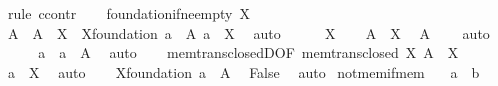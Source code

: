 \begin{isabellebody}
%
\isatagproof
{}\isamarkupfalse%
\ {\isacharparenleft}{\kern0pt}rule\ ccontr{\isacharparenright}{\kern0pt}\isanewline
\ \ \isamarkupfalse%
\ foundation{\isacharunderscore}{\kern0pt}if{\isacharunderscore}{\kern0pt}ne{\isacharunderscore}{\kern0pt}empty\ {\isacartoucheopen}X\ {\isasymnoteq}\ {\isacharbraceleft}{\kern0pt}{\isacharbraceright}{\kern0pt}{\isacartoucheclose}\isanewline
\ \ \ \ \isamarkupfalse%
\ A\ \ {\isachardoublequoteopen}A\ {\isasymin}\ X{\isachardoublequoteclose}\ \ X{\isacharunderscore}{\kern0pt}foundation{\isacharcolon}{\kern0pt}\ {\isachardoublequoteopen}{\isasymforall}a\ {\isasymin}\ A{\isachardot}{\kern0pt}\ a\ {\isasymnotin}\ X{\isachardoublequoteclose}\ \isamarkupfalse%
\ auto\isanewline
\ \ \isamarkupfalse%
\ {\isachardoublequoteopen}{\isacharbraceleft}{\kern0pt}{\isacharbraceright}{\kern0pt}\ {\isasymnotin}\ X{\isachardoublequoteclose}\isanewline
\ \ \isamarkupfalse%
\ {\isacartoucheopen}A\ {\isasymin}\ X{\isacartoucheclose}\ \isamarkupfalse%
\ {\isachardoublequoteopen}A\ {\isasymnoteq}\ {\isacharbraceleft}{\kern0pt}{\isacharbraceright}{\kern0pt}{\isachardoublequoteclose}\ \isamarkupfalse%
\ auto\isanewline
\ \ \isamarkupfalse%
\ \isamarkupfalse%
\ a\ \ {\isachardoublequoteopen}a\ {\isasymin}\ A{\isachardoublequoteclose}\ \isamarkupfalse%
\ auto\isanewline
\ \ \isamarkupfalse%
\ mem{\isacharunderscore}{\kern0pt}trans{\isacharunderscore}{\kern0pt}closedD{\isacharbrackleft}{\kern0pt}OF\ {\isacartoucheopen}mem{\isacharunderscore}{\kern0pt}trans{\isacharunderscore}{\kern0pt}closed\ X{\isacartoucheclose}\ {\isacartoucheopen}A\ {\isasymin}\ X{\isacartoucheclose}{\isacharbrackright}{\kern0pt}\ \isamarkupfalse%
\ {\isachardoublequoteopen}a\ {\isasymin}\ X{\isachardoublequoteclose}\ \isamarkupfalse%
\ auto\isanewline
\ \ \isamarkupfalse%
\ X{\isacharunderscore}{\kern0pt}foundation\ {\isacartoucheopen}a\ {\isasymin}\ A{\isacartoucheclose}\ \isamarkupfalse%
\ False\ \isamarkupfalse%
\ auto\isanewline
{}\isamarkupfalse%
%
\endisatagproof
{\isafoldproof}%
%
\isadelimproof
\isanewline
%
\endisadelimproof
\isanewline
{}\isamarkupfalse%
\ not{\isacharunderscore}{\kern0pt}mem{\isacharunderscore}{\kern0pt}if{\isacharunderscore}{\kern0pt}mem{\isacharcolon}{\kern0pt}\isanewline
\ \ \ {\isachardoublequoteopen}a\ {\isasymin}\ b{\isachardoublequoteclose}\isanewline

\end{isabellebody}
